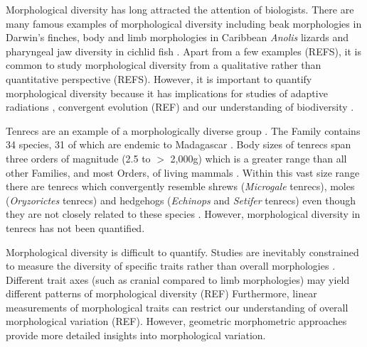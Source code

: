\documentclass[12pt,a4paper]{article}
\begin{document}
	Morphological diversity has long attracted the attention of biologists. There are many famous examples of morphological diversity including beak morphologies in Darwin's finches, body and limb morphologies in Caribbean \textit{Anolis} lizards and pharyngeal jaw diversity in cichlid fish \citep{Gavrilets2009}. %
	Apart from a few examples (REFS), it is common to study morphological diversity from a qualitative rather than quantitative perspective (REFS). However, it is important to quantify morphological diversity because it has implications for studies of adaptive radiations \citep{Losos2010}, convergent evolution (REF) and our understanding of biodiversity \citep{Roy1997}.
	


	Tenrecs are an example of a morphologically diverse group \citep{Soarimalala2011, Olson2003}. The Family contains 34 species, 31 of which are endemic to Madagascar \citep{Olson2013}. Body sizes of tenrecs span three orders of magnitude (2.5 to $>$ 2,000g) which is a greater range than all other Families, and most Orders, of living mammals \citep{Olson2003}. Within this vast size range there are tenrecs which convergently resemble shrews (\textit{Microgale} tenrecs), moles (\textit{Oryzorictes} tenrecs) and hedgehogs (\textit{Echinops} and \textit{Setifer} tenrecs) \citep{Eisenberg1969} even though they are not closely related to these species \citep{Stanhope1998}. However, morphological diversity in tenrecs has not been quantified.


	Morphological diversity is difficult to quantify. Studies are inevitably constrained to measure the diversity of specific traits rather than overall morphologies \citep{Roy1997}. Different trait axes (such as cranial compared to limb morphologies) may yield different patterns of morphological diversity (REF) %
	Furthermore, linear measurements of morphological traits can restrict our understanding of overall morphological variation (REF). However, geometric morphometric approaches \citep{Rohlf1993, Adams2013} provide more detailed insights into morphological variation.
	 
\end{document}
